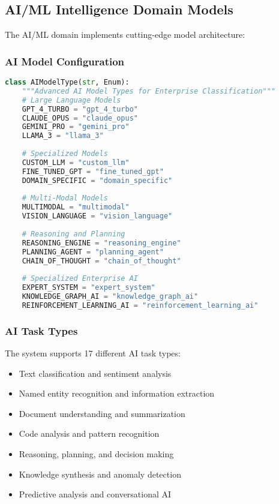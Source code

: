 \subsection{AI/ML Intelligence Domain Models}

The AI/ML domain implements cutting-edge model architecture:

\subsubsection{AI Model Configuration}
\begin{lstlisting}[language=Python, caption=Advanced AI Model Types]
class AIModelType(str, Enum):
    """Advanced AI Model Types for Enterprise Classification"""
    # Large Language Models
    GPT_4_TURBO = "gpt_4_turbo"
    CLAUDE_OPUS = "claude_opus"
    GEMINI_PRO = "gemini_pro"
    LLAMA_3 = "llama_3"
    
    # Specialized Models
    CUSTOM_LLM = "custom_llm"
    FINE_TUNED_GPT = "fine_tuned_gpt"
    DOMAIN_SPECIFIC = "domain_specific"
    
    # Multi-Modal Models
    MULTIMODAL = "multimodal"
    VISION_LANGUAGE = "vision_language"
    
    # Reasoning and Planning
    REASONING_ENGINE = "reasoning_engine"
    PLANNING_AGENT = "planning_agent"
    CHAIN_OF_THOUGHT = "chain_of_thought"
    
    # Specialized Enterprise AI
    EXPERT_SYSTEM = "expert_system"
    KNOWLEDGE_GRAPH_AI = "knowledge_graph_ai"
    REINFORCEMENT_LEARNING_AI = "reinforcement_learning_ai"
\end{lstlisting}

\subsubsection{AI Task Types}

The system supports 17 different AI task types:
\begin{itemize}
    \item Text classification and sentiment analysis
    \item Named entity recognition and information extraction
    \item Document understanding and summarization
    \item Code analysis and pattern recognition
    \item Reasoning, planning, and decision making
    \item Knowledge synthesis and anomaly detection
    \item Predictive analysis and conversational AI
\end{itemize}

